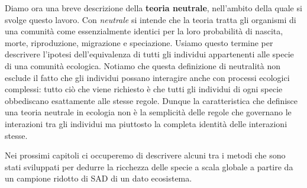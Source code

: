 Diamo ora una breve descrizione della \textbf{teoria neutrale}, nell'ambito della quale si svolge questo lavoro\cite{Hubbell}. Con \emph{neutrale} si intende che la teoria tratta gli organismi di una comunità come essenzialmente identici per la loro probabilità di nascita, morte, riproduzione, migrazione e speciazione. Usiamo questo termine per descrivere l'ipotesi dell'equivalenza di tutti gli individui appartenenti alle specie di una comunità ecologica. Notiamo che questa definizione di neutralità non esclude il fatto che gli individui possano interagire anche con processi ecologici complessi: tutto ciò che viene richiesto è che tutti gli individui di ogni specie obbediscano esattamente alle stesse regole. Dunque la caratteristica che definisce una teoria neutrale in ecologia non è la semplicità delle regole che governano le interazioni tra gli individui ma piuttosto la completa identità delle interazioni stesse.



Nei prossimi capitoli ci occuperemo di descrivere alcuni tra i metodi che sono stati sviluppati per dedurre la ricchezza delle specie a scala globale a partire da un campione ridotto di SAD di un dato ecosistema. 








%



           

